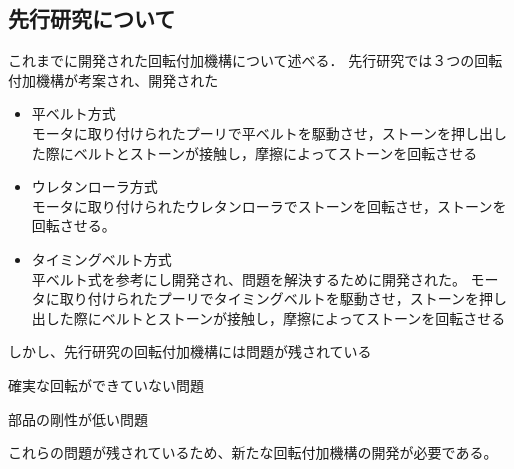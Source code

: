 \documentclass{classes/sice-si}
\begin{document}
\subsection{先行研究について}
これまでに開発された回転付加機構について述べる．
先行研究では３つの回転付加機構が考案され、開発された
\begin{itemize}
    \item 平ベルト方式 \mbox{}\\
    モータに取り付けられたプーリで平ベルトを駆動させ，ストーンを押し出した際にベルトとストーンが接触し，摩擦によってストーンを回転させる
    \item ウレタンローラ方式\mbox{}\\
    モータに取り付けられたウレタンローラでストーンを回転させ，ストーンを回転させる。
    \item タイミングベルト方式\mbox{}\\
    平ベルト式を参考にし開発され、問題を解決するために開発された。
    モータに取り付けられたプーリでタイミングベルトを駆動させ，ストーンを押し出した際にベルトとストーンが接触し，摩擦によってストーンを回転させる
\end{itemize}
しかし、先行研究の回転付加機構には問題が残されている
\begin{description}
    \item 確実な回転ができていない問題
    \item 部品の剛性が低い問題
\end{description}
これらの問題が残されているため、新たな回転付加機構の開発が必要である。
\end{document}
